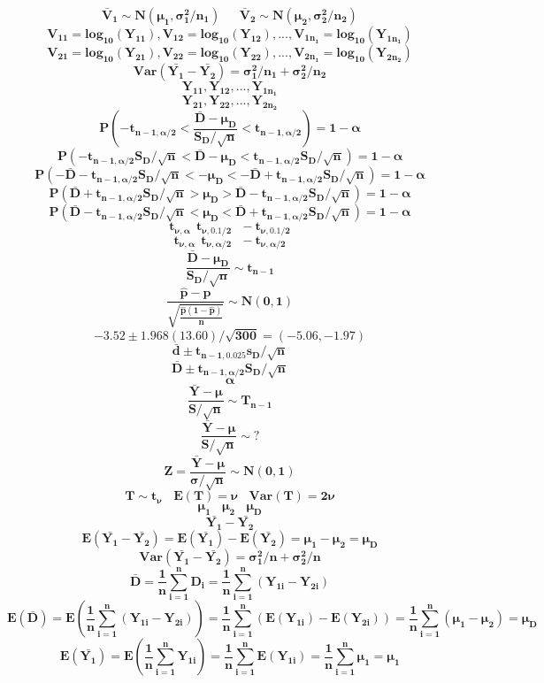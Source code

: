\documentclass[12pt,portrait,semhelv,semrot]{article}
\begin{document}
{{$$\boldsymbol{\bar{V}_1 \sim N(\mu_1,\sigma^2_1/n_1)~~~~~~~\bar{V}_2 \sim N(\mu_2,\sigma^2_2/n_2)}$$
$$\boldsymbol{V_{11} = log_{10}(Y_{11}), V_{12} = log_{10}(Y_{12}), ..., V_{1n_1} = log_{10}(Y_{1n_1})}$$
$$\boldsymbol{V_{21} = log_{10}(Y_{21}), V_{22} = log_{10}(Y_{22}), ..., V_{2n_1} = log_{10}(Y_{2n_2})}$$
$$\boldsymbol{Var\left(\bar{Y_1}-\bar{Y_2}\right)= \sigma_1^2/n_1+\sigma^2_2/n_2}$$
$$\boldsymbol{Y_{11}, Y_{12}, ..., Y_{1n_1}}$$
$$\boldsymbol{Y_{21}, Y_{22}, ..., Y_{2n_2}}$$
$$\boldsymbol{P\left(-t_{n-1,\alpha/2} < \frac{\bar{D} - \mu_D}{S_D/\sqrt{n}} < t_{n-1,\alpha/2}\right) = 1-\alpha}$$
$$\boldsymbol{P\left(-t_{n-1,\alpha/2}S_D/\sqrt{n} < \bar{D} - \mu_D < t_{n-1,\alpha/2}S_D/\sqrt{n}\right) = 1-\alpha}$$
$$\boldsymbol{P\left(-\bar{D}-t_{n-1,\alpha/2}S_D/\sqrt{n} < - \mu_D < -\bar{D}+t_{n-1,\alpha/2}S_D/\sqrt{n}\right) = 1-\alpha}$$
$$\boldsymbol{P\left(\bar{D}+t_{n-1,\alpha/2}S_D/\sqrt{n} >  \mu_D > \bar{D}-t_{n-1,\alpha/2}S_D/\sqrt{n}\right) = 1-\alpha}$$
$$\boldsymbol{P\left(\bar{D}-t_{n-1,\alpha/2}S_D/\sqrt{n} <  \mu_D <\bar{D}+t_{n-1,\alpha/2}S_D/\sqrt{n} \right) = 1-\alpha}$$
$$\boldsymbol{t_{\nu, \alpha} ~~t_{\nu, 0.1/2}~~~-t_{\nu, 0.1/2}}$$
$$\boldsymbol{t_{\nu, \alpha} ~~t_{\nu, \alpha/2}~~~-t_{\nu, \alpha/2}}$$
$$\boldsymbol{\frac{\bar{D}-\mu_D}{S_D/\sqrt{n}}\sim t_{n-1}}$$
$$\boldsymbol{\frac{\hat{p}-p}{\sqrt{\frac{\hat{p}(1-\hat{p})}{n}}}\sim N(0,1)}$$		
$$\boldsymbol{-3.52\pm 1.968(13.60)/\sqrt{300} = (-5.06, -1.97)}$$
$$\boldsymbol{\bar{d}\pm t_{n-1,0.025}s_D/\sqrt{n}}$$
$$\boldsymbol{\bar{D}\pm t_{n-1,\alpha/2}S_D/\sqrt{n}}$$
$$\boldsymbol{\alpha}$$
		$$\boldsymbol{\frac{\bar{Y}-\mu}{S/\sqrt{n}} \sim T_{n-1}}$$			$$\boldsymbol{\frac{\bar{Y}-\mu}{S/\sqrt{n}} \sim ?}$$		
		$$\boldsymbol{Z = \frac{\bar{Y}-\mu}{\sigma/\sqrt{n}} \sim N(0,1)}$$
$$\boldsymbol{T \sim t_{\nu}~~~~E(T) = \nu~~~~Var(T) = 2\nu}$$
$$\boldsymbol{\mu_1~~~~\mu_2~~~~\mu_D}$$
$$\boldsymbol{\bar{Y_1}-\bar{Y_2}}$$
$$\boldsymbol{E\left(\bar{Y_1}-\bar{Y_2}\right)= E\left(\bar{Y_1}\right) - E\left(\bar{Y_2}\right) = \mu_1-\mu_2 = \mu_D}$$
$$\boldsymbol{Var\left(\bar{Y_1}-\bar{Y_2}\right)= \sigma_1^2/n+\sigma^2_2/n}$$
$$\boldsymbol{\bar{D} = \frac{1}{n}\sum_{i=1}^{n}D_i = \frac{1}{n}\sum_{i=1}^{n}(Y_{1i}-Y_{2i})}$$ 
$$\boldsymbol{E\left(\bar{D}\right) = E\left(\frac{1}{n}\sum_{i=1}^{n}(Y_{1i}-Y_{2i})\right) = \frac{1}{n}\sum_{i=1}^{n}\left(E\left(Y_{1i}\right)-E\left(Y_{2i}\right)\right) = \frac{1}{n}\sum_{i=1}^{n}(\mu_1-\mu_2) = \mu_D}$$
$$\boldsymbol{E\left(\bar{Y_1}\right) = E\left(\frac{1}{n}\sum_{i=1}^{n}Y_{1i}\right) = \frac{1}{n}\sum_{i=1}^{n}E(Y_{1i}) = \frac{1}{n}\sum_{i=1}^{n}\mu_1 = \mu_1}$$
}}
\end{document}
